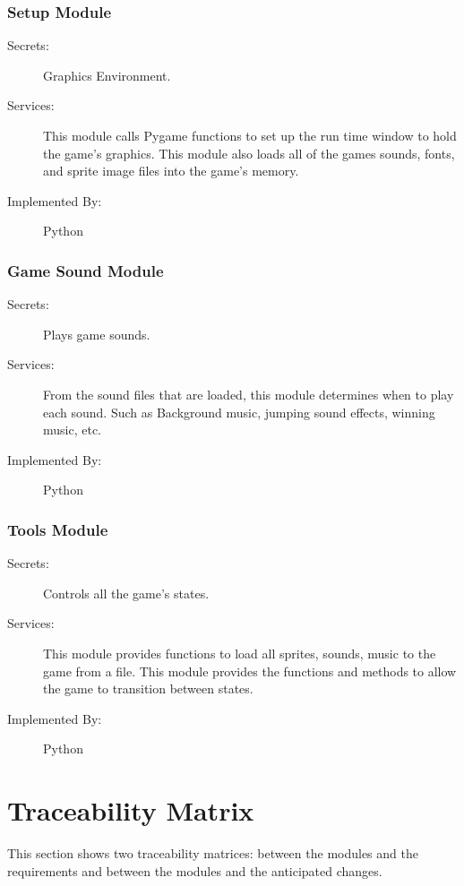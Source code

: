 \documentclass[12pt, titlepage]{article}
\begin{document}
\subsubsection{Setup Module}
\begin{description}
\item[Secrets:]Graphics Environment.
\item[Services:] This module calls Pygame functions to set up the run time window to hold the game's graphics.
    This module also loads all of the games sounds, fonts, and sprite image files into the game's memory.
\item[Implemented By:] Python
\end{description}

\subsubsection{Game Sound Module}
\begin{description}
\item[Secrets:]Plays game sounds.
\item[Services:] From the sound files that are loaded, this module determines when to play each sound. Such as
    Background music, jumping sound effects, winning music, etc.
\item[Implemented By:] Python
\end{description}

\subsubsection{Tools Module}
\begin{description}
\item[Secrets:] Controls all the game's states.
\item[Services:] This module provides functions to load all sprites, sounds, music to the game from a file.
    This module provides the functions and methods to allow the game to transition between states.
\item[Implemented By:] Python
\end{description}

\newpage
\section{Traceability Matrix} \label{SecTM}

This section shows two traceability matrices: between the modules and the
requirements and between the modules and the anticipated changes.
\end{document}

